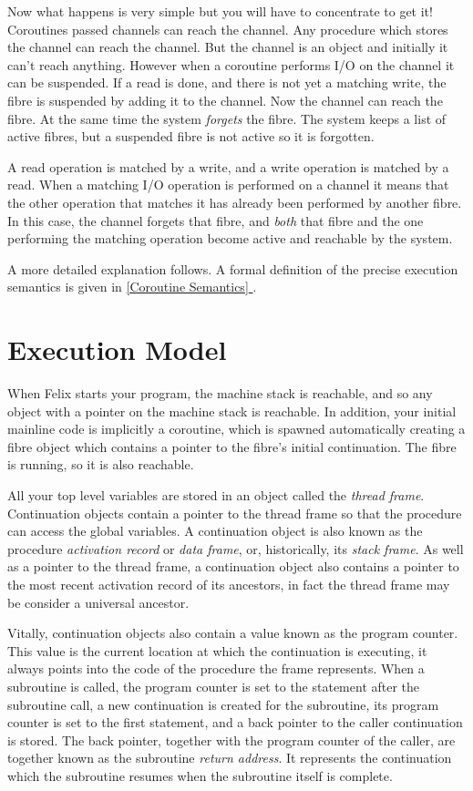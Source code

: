 \documentclass[oneside]{book}
\newcommand*{\fullref}[1]{\hyperref[{#1}]{\autoref*{#1} \nameref*{#1}}}
\begin{document}
Now what happens is very simple but you will have to concentrate
to get it! Coroutines passed channels can reach the channel.
Any procedure which stores the channel can reach the channel.
But the channel is an object and initially it can't reach anything.
However when a coroutine performs I/O on the channel it can be
suspended. If a read is done, and there is not yet a matching write,
the fibre is suspended by adding it to the channel. Now the channel
can reach the fibre. At the same time the system {\em forgets} the
fibre. The system keeps a list of active fibres, but a suspended
fibre is not active so it is forgotten.

A read operation is matched by a write, and a write operation
is matched by a read. When a matching I/O operation is performed
on a channel it means that the other operation that matches it
has already been performed by another fibre. In this case,
the channel forgets that fibre, and {\em both} that fibre and the
one performing the matching operation become active and reachable
by the system.

A more detailed explanation follows. A formal definition of the
precise execution semantics is given in \fullref{Coroutine Semantics}.

\section{Execution Model}
When Felix starts your program, the machine stack is reachable,
and so any object with a pointer on the machine stack is reachable.
In addition, your initial mainline code is implicitly a coroutine,
which is spawned automatically creating a fibre object
which contains a pointer to the fibre's initial continuation.
The fibre is running, so it is also reachable.

All your top level variables are stored in an object called
the {\em thread frame}. Continuation objects contain a pointer
to the thread frame so that the procedure can access the global
variables. A continuation object is also known as the procedure
{\em activation record} or {\em data frame}, or, historically,
its {\em stack frame}. As well as a pointer to the thread
frame, a continuation object also contains a pointer to the
most recent activation record of its ancestors, in fact the
thread frame may be consider a universal ancestor.

Vitally, continuation objects also contain a value known as
the program counter. This value is the current location at which
the continuation is executing, it always points into the code
of the procedure the frame represents. When a subroutine is
called, the program counter is set to the statement after the
subroutine call, a new continuation is created for the subroutine,
its program counter is set to the first statement, and a back pointer
to the caller continuation is stored. The back pointer, together with
the program counter of the caller, are together known as the subroutine
{\em return address}. It represents the continuation which the
subroutine resumes when the subroutine itself is complete.
\end{document}
